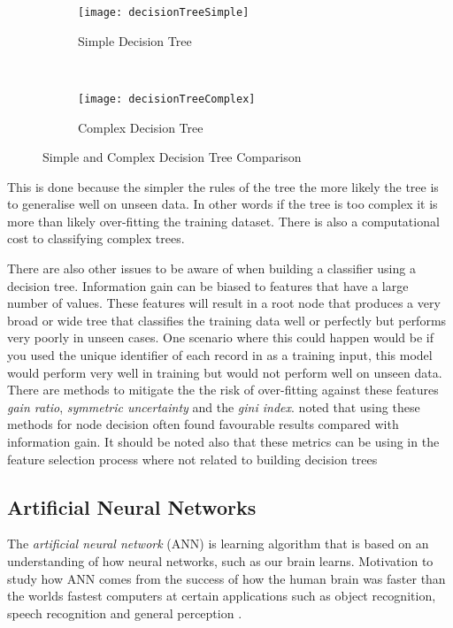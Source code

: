 \begin{figure}[H]
	\centering
	\begin{subfigure}[b]{0.45\textwidth}
		\captionsetup{font=scriptsize}
		\texttt{[image: decisionTreeSimple]}
		\caption{Simple Decision Tree}\label{fig:decisionTreeSimple}
		\label{fig:simple}
	\end{subfigure} ~\quad
	\begin{subfigure}[b]{0.45\textwidth}
		\captionsetup{font=scriptsize}
		\texttt{[image: decisionTreeComplex]}
		\caption{Complex Decision Tree}\label{fig:decisionTreeComplex}
		\label{fig:complex}
	\end{subfigure}
	\caption{Simple and Complex Decision Tree Comparison\\\cite[Source:][]{quinlan_induction_1986}}
	\label{fig:simpleComplex}
\end{figure}

This is done because the simpler the rules of the tree the more likely the tree is to generalise well on unseen data. In other words if the tree is too complex it is more than likely over-fitting the training dataset. There is also a computational cost to classifying complex trees. 

There are also other issues to be aware of when building a classifier using a decision tree. Information gain can be biased to features that have a large number of values. These features will result in a root node that produces a very broad or wide tree that classifies the training data well or perfectly but performs very poorly in unseen cases. One scenario where this could happen would be if you used the unique identifier of each record in as a training input, this model would perform very well in training but would not perform well on unseen data. There are methods to mitigate the the risk of over-fitting against these features \textit{gain ratio}, \textit{symmetric uncertainty} and the \textit{gini index}. \cite{quinlan_induction_1986} noted that using these methods for node decision often found favourable results compared with information gain. It should be noted also that these metrics can be using in the feature selection process where not related to building decision trees


\subsection{Artificial Neural Networks} \label{neuralNets}
The \textit{artificial neural network} (ANN) is learning algorithm that is based on an understanding of how neural networks, such as our brain learns. Motivation to study how ANN comes from the success of how the human brain was faster than the worlds fastest computers at certain applications such as object recognition, speech recognition and general perception \citep{haykin_neural_1998}.

